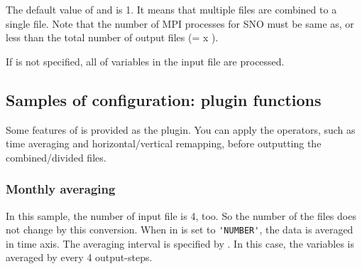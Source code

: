 The default value of  and  is 1. It means that multiple files are combined to a single file.
Note that the number of MPI processes for SNO must be same as, or less than the total number of output files (=  x ).

If  is not specified, all of variables in the input file are processed.

\subsection{Samples of configuration: plugin functions}

Some features of \sno is provided as the plugin.
You can apply the operators, such as time averaging and horizontal/vertical remapping, before outputting the combined/divided files.

\subsubsection{Monthly averaging}


In this sample, the number of input file is 4, too. So the number of the files does not change by this conversion.
When  in  is set to \verb|'NUMBER'|, the data is averaged in time axis. The averaging interval is specified by . In this case, the variables is averaged by every 4 output-steps.

